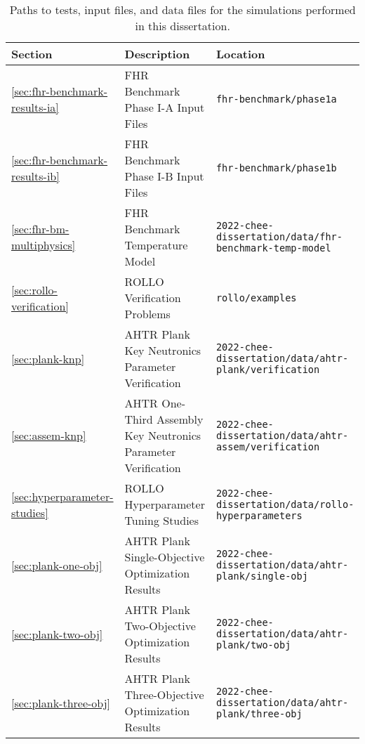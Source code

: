 \begin{landscape}
\begin{table}[htbp!]
    \centering
    \onehalfspacing
    \caption{Paths to tests, input files, and data files for the simulations performed 
    in this dissertation. }
    \label{tab:reproducibility}
    \begin{tabular}{p{2cm}p{8cm}p{12cm}}
    \toprule
    \textbf{Section} & \textbf{Description} & \textbf{Location} \\
    \midrule
    \ref{sec:fhr-benchmark-results-ia} & FHR Benchmark Phase I-A Input Files & 
    \texttt{fhr-benchmark/phase1a} \\ 
    \midrule
    \ref{sec:fhr-benchmark-results-ib} & FHR Benchmark Phase I-B Input Files & 
    \texttt{fhr-benchmark/phase1b} \\ 
    \midrule
    \ref{sec:fhr-bm-multiphysics} & FHR Benchmark Temperature Model & 
    \texttt{2022-chee-dissertation/data/fhr-benchmark-temp-model} \\ 
    \midrule
    \ref{sec:rollo-verification} & ROLLO Verification Problems & 
    \texttt{rollo/examples} \\ 
    \midrule
    \ref{sec:plank-knp} & AHTR Plank Key Neutronics Parameter Verification & 
    \texttt{2022-chee-dissertation/data/ahtr-plank/verification} \\
    \midrule
    \ref{sec:assem-knp} & AHTR One-Third Assembly Key Neutronics Parameter Verification & 
    \texttt{2022-chee-dissertation/data/ahtr-assem/verification} \\
    \midrule
    \ref{sec:hyperparameter-studies} & ROLLO Hyperparameter Tuning Studies & 
    \texttt{2022-chee-dissertation/data/rollo-hyperparameters} \\
    \midrule
    \ref{sec:plank-one-obj} & AHTR Plank Single-Objective Optimization Results & 
    \texttt{2022-chee-dissertation/data/ahtr-plank/single-obj} \\
    \midrule
    \ref{sec:plank-two-obj} & AHTR Plank Two-Objective Optimization Results & 
    \texttt{2022-chee-dissertation/data/ahtr-plank/two-obj} \\
    \midrule
    \ref{sec:plank-three-obj} & AHTR Plank Three-Objective Optimization Results & 
    \texttt{2022-chee-dissertation/data/ahtr-plank/three-obj} \\
    \bottomrule
    \end{tabular}
\end{table}
\end{landscape}